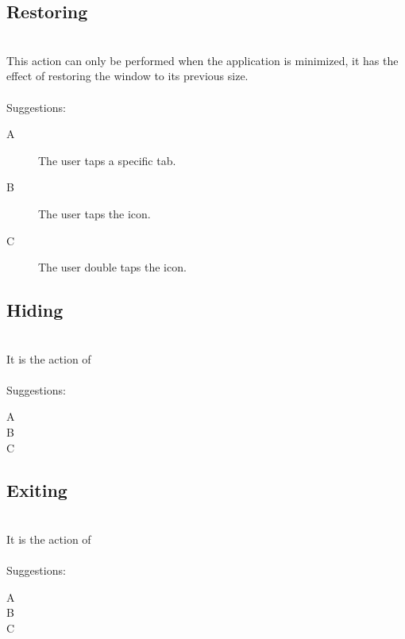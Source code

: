 \documentclass[11pt]{amsart}
\begin{document}
\subsection{Restoring}
\hfill\\
This action can only be performed when the application is minimized, it has the effect of restoring the window to its previous size.  
\\\\
Suggestions:
\begin{description}
\item[A]{The user taps a specific tab.}
\item[B]{The user taps the icon.}
\item[C]{The user double taps the icon.}
\end{description}

\subsection{Hiding}
\hfill\\
It is the action of 
\\\\
Suggestions:
\begin{description}
\item[A]
\item[B]
\item[C]
\end{description}

\subsection{Exiting}
\hfill\\
It is the action of 
\\\\
Suggestions:
\begin{description}
\item[A]
\item[B]
\item[C]
\end{description}
\end{document}
